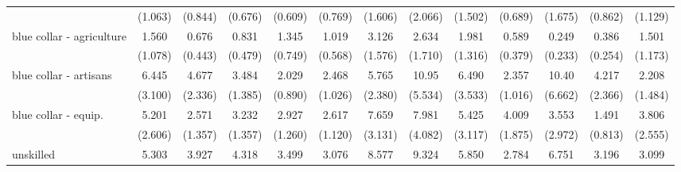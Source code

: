{\begin{tabular}{l*{12}{c}}
                    &     (1.063)         &     (0.844)         &     (0.676)         &     (0.609)         &     (0.769)         &     (1.606)         &     (2.066)         &     (1.502)         &     (0.689)         &     (1.675)         &     (0.862)         &     (1.129)         \\
[1em]
blue collar - agriculture&       1.560         &       0.676         &       0.831         &       1.345         &       1.019         &       3.126\sym{*}  &       2.634         &       1.981         &       0.589         &       0.249         &       0.386         &       1.501         \\
                    &     (1.078)         &     (0.443)         &     (0.479)         &     (0.749)         &     (0.568)         &     (1.576)         &     (1.710)         &     (1.316)         &     (0.379)         &     (0.233)         &     (0.254)         &     (1.173)         \\
[1em]
blue collar - artisans&       6.445\sym{***}&       4.677\sym{**} &       3.484\sym{**} &       2.029         &       2.468\sym{*}  &       5.765\sym{***}&       10.95\sym{***}&       6.490\sym{***}&       2.357\sym{*}  &       10.40\sym{***}&       4.217\sym{*}  &       2.208         \\
                    &     (3.100)         &     (2.336)         &     (1.385)         &     (0.890)         &     (1.026)         &     (2.380)         &     (5.534)         &     (3.533)         &     (1.016)         &     (6.662)         &     (2.366)         &     (1.484)         \\
[1em]
blue collar - equip.&       5.201\sym{***}&       2.571         &       3.232\sym{**} &       2.927\sym{*}  &       2.617\sym{*}  &       7.659\sym{***}&       7.981\sym{***}&       5.425\sym{**} &       4.009\sym{**} &       3.553         &       1.491         &       3.806\sym{*}  \\
                    &     (2.606)         &     (1.357)         &     (1.357)         &     (1.260)         &     (1.120)         &     (3.131)         &     (4.082)         &     (3.117)         &     (1.875)         &     (2.972)         &     (0.813)         &     (2.555)         \\
[1em]
unskilled           &       5.303\sym{***}&       3.927\sym{**} &       4.318\sym{***}&       3.499\sym{***}&       3.076\sym{**} &       8.577\sym{***}&       9.324\sym{***}&       5.850\sym{***}&       2.784\sym{**} &       6.751\sym{***}&       3.196\sym{**} &       3.099         \\

\end{tabular}}
